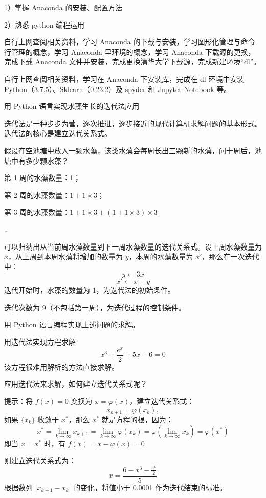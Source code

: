 \documentclass{report}
\begin{document}
\makecover

\makereportheader

1）掌握 Anaconda 的安装、配置方法\par
2）熟悉 python 编程运用


自行上网查阅相关资料，学习 Anaconda 的下载与安装，学习图形化管理与命令行管理的概念，学习 Anaconda 里环境的概念，学习 Anaconda 下载源的更换，完成下载 Anaconda 文件并安装，完成更换清华大学下载源，完成新建环境“dl”。\par
\vspace{0.8ex}
自行上网查阅相关资料，学习在 Anaconda 下安装库，完成在 dl 环境中安装 Python（3.7.5）、Sklearn（0.23.2）及 spyder 和 Jupyter Notebook 等。\par
\vspace{0.8ex}
用 Python 语言实现水藻生长的迭代法应用\par
迭代法是一种步步为营，逐次推进，逐步接近的现代计算机求解问题的基本形式。迭代法的核心是建立迭代关系式。\par
假设在空池塘中放入一颗水藻，该类水藻会每周长出三颗新的水藻，问十周后，池塘中有多少颗水藻？\par
第 1 周的水藻数量：1；\par
第 2 周的水藻数量：$1 + 1 \times 3$；\par
第 3 周的水藻数量：$1 + 1 \times 3 + (1 + 1 \times 3) \times 3$\par
…\par
可以归纳出从当前周水藻数量到下一周水藻数量的迭代关系式。设上周水藻数量为 $x$，从上周到本周水藻将增加的数量为 $y$，本周的水藻数量为 $x'$，那么在一次迭代中：
\[
  y \leftarrow 3x
\]
\[
  x' \leftarrow x + y
\]
迭代开始时，水藻的数量为 1，为迭代法的初始条件。

迭代次数为 9（不包括第一周），为迭代过程的控制条件。\par
用 Python 语言编程实现上述问题的求解。\par
\vspace{0.8ex}
用迭代法实现方程求解
\[
  x^3 + \frac{e^x}{2} + 5x - 6 = 0
\]
该方程很难用解析的方法直接求解。\par
应用迭代法来求解，如何建立迭代关系式呢？\par
提示：将 $f(x) = 0$ 变换为 $x = \varphi(x)$，建立迭代关系式：
\[
  x_{k+1} = \varphi(x_k),
\]
如果 $\{x_k\}$ 收敛于 $x^*$，那么 $x^*$ 就是方程的根，因为：
\[
  x^* = \lim_{k\to\infty} x_{k+1} = \lim_{k\to\infty} \varphi(x_k) = \varphi\left(\lim_{k\to\infty} x_k\right) = \varphi(x^*)
\]
即当 $x = x^*$ 时，有 $f(x) = x - \varphi(x) = 0$\par
则建立迭代关系式为：
\[
  x = \frac{6 - x^3 - \frac{e^x}{2}}{5}
\]
根据数列 $|x_{k+1} - x_k|$ 的变化，将值小于 0.0001 作为迭代结束的标准。
\end{document}

